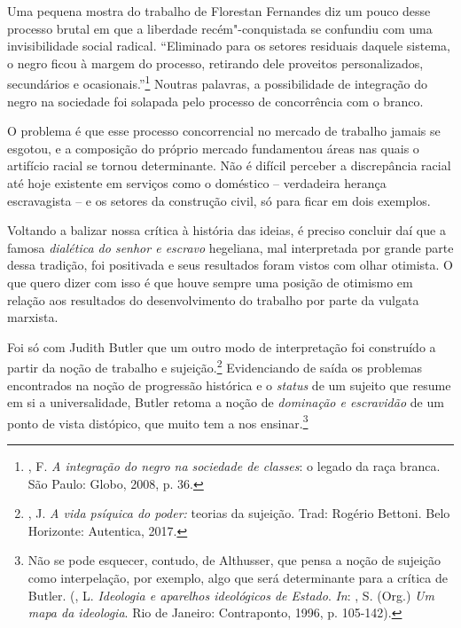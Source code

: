 Uma pequena mostra do trabalho de Florestan Fernandes diz um pouco desse
processo brutal em que a liberdade recém"-conquistada se confundiu com
uma invisibilidade social radical. ``Eliminado para os setores residuais
daquele sistema, o negro ficou à margem do processo, retirando dele
proveitos personalizados, secundários e ocasionais.''\footnote{,
  F. \emph{A integração do negro na sociedade de classes}: o legado da
  raça branca. São Paulo: Globo, 2008, p. 36.} Noutras palavras, a
possibilidade de integração do negro na sociedade foi solapada pelo
processo de concorrência com o branco.

O problema é que esse processo concorrencial no mercado de trabalho
jamais se esgotou, e a composição do próprio mercado fundamentou áreas
nas quais o artifício racial se tornou determinante. Não é difícil
perceber a discrepância racial até hoje existente em serviços como o
doméstico -- verdadeira herança escravagista -- e os setores da
construção civil, só para ficar em dois exemplos.

Voltando a balizar nossa crítica à história das ideias, é preciso
concluir daí que a famosa \emph{dialética do senhor e escravo}
hegeliana, mal interpretada por grande parte dessa tradição, foi
positivada e seus resultados foram vistos com olhar otimista. O que
quero dizer com isso é que houve sempre uma posição de otimismo em
relação aos resultados do desenvolvimento do trabalho por parte da
vulgata marxista.

Foi só com Judith Butler que um outro modo de interpretação foi
construído a partir da noção de trabalho e sujeição.\footnote{, J.
  \emph{A vida psíquica do poder:} teorias da sujeição. Trad: Rogério
  Bettoni. Belo Horizonte: Autentica, 2017.} Evidenciando de saída os
problemas encontrados na noção de progressão histórica e o \emph{status}
de um sujeito que resume em si a universalidade, Butler retoma a noção
de \emph{dominação e escravidão} de um ponto de vista distópico, que
muito tem a nos ensinar.\footnote{Não se pode esquecer, contudo, de
  Althusser, que pensa a noção de sujeição como interpelação, por
  exemplo, algo que será determinante para a crítica de Butler.
  (, L. \emph{Ideologia e aparelhos ideológicos de Estado}. \emph{In}: , S. (Org.) \emph{Um mapa da ideologia}. Rio de Janeiro: Contraponto, 1996, p. 105-142).}

